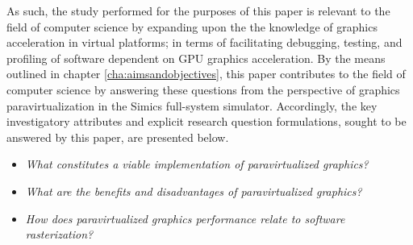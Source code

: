 As such, the study performed for the purposes of this paper is relevant to the field of computer science by expanding upon the the knowledge of graphics acceleration in virtual platforms; in terms of facilitating debugging, testing, and profiling of software dependent on GPU graphics acceleration.
By the means outlined in chapter \ref{cha:aimsandobjectives}, this paper contributes to the field of computer science by answering these questions from the perspective of graphics paravirtualization in the Simics full-system simulator.
Accordingly, the key investigatory attributes and explicit research question formulations, sought to be answered by this paper, are presented below.

\newcommand*\researchquestionitem[2]{\item[#1:] \textit{#2}}
\begin{itemize}[noitemsep]
  \researchquestionitem{1}{What constitutes a viable implementation of paravirtualized graphics?}
  \researchquestionitem{2}{What are the benefits and disadvantages of paravirtualized graphics?}
  \researchquestionitem{3}{How does paravirtualized graphics performance relate to software rasterization?}
\end{itemize}
